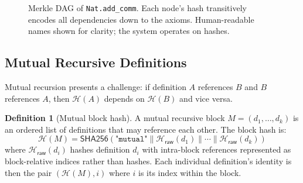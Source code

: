 \documentclass[11pt]{article}
\theoremstyle{definition}
\newtheorem{definition}{Definition}[section]
\theoremstyle{plain}
\theoremstyle{remark}
\newcommand{\hash}{\mathcal{H}}
\newcommand{\SHA}{\textsf{SHA256}}
\newcommand{\concat}{\mathbin{\|}}
\begin{document}
\begin{figure}[t]
\centering
{}
\caption{Merkle DAG of \texttt{Nat.add\_comm}. Each node's hash transitively encodes all dependencies
down to the axioms. Human-readable names shown for clarity; the system operates on hashes.}
\label{fig:merkle}
\end{figure}

\subsection{Mutual Recursive Definitions}
\label{sec:mutual}

Mutual recursion presents a challenge: if definition $A$ references $B$ and $B$ references $A$,
then $\hash(A)$ depends on $\hash(B)$ and vice versa.

\begin{definition}[Mutual block hash]
A mutual recursive block $M = (d_1, \ldots, d_k)$ is an ordered list of definitions that
may reference each other.
The block hash is:
\[
  \hash(M) = \SHA(\texttt{"mutual"} \concat \hash_{\textsf{raw}}(d_1) \concat \cdots \concat \hash_{\textsf{raw}}(d_k))
\]
where $\hash_{\textsf{raw}}(d_i)$ hashes definition $d_i$ with intra-block references represented
as block-relative indices rather than hashes.
Each individual definition's identity is then the pair $(\hash(M), i)$ where $i$ is its index
within the block.
\end{definition}
\end{document}
